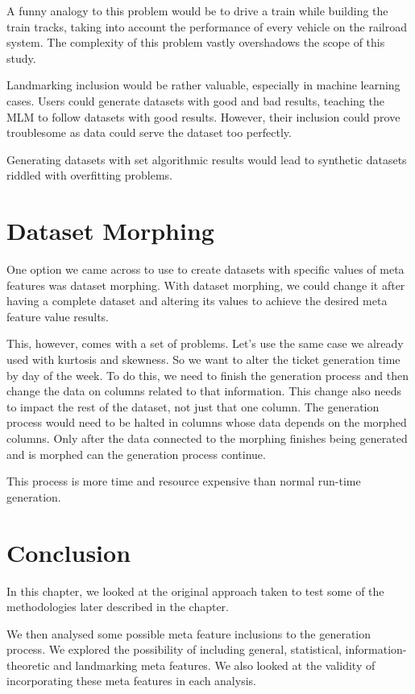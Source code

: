 A funny analogy to this problem would be to drive a train while building the train tracks, taking into account the performance of every vehicle on the railroad system. The complexity of this problem vastly overshadows the scope of this study.

Landmarking inclusion would be rather valuable, especially in machine learning cases. Users could generate datasets with good and bad results, teaching the MLM to follow datasets with good results. However, their inclusion could prove troublesome as data could serve the dataset too perfectly. 

Generating datasets with set algorithmic results would lead to synthetic datasets riddled with overfitting problems.

\section{Dataset Morphing}
One option we came across to use to create datasets with specific values of meta features was dataset morphing. With dataset morphing, we could change it after having a complete dataset and altering its values to achieve the desired meta feature value results.

This, however, comes with a set of problems. Let's use the same case we already used with kurtosis and skewness. So we want to alter the ticket generation time by day of the week. To do this, we need to finish the generation process and then change the data on columns related to that information. This change also needs to impact the rest of the dataset, not just that one column. The generation process would need to be halted in columns whose data depends on the morphed columns. Only after the data connected to the morphing finishes being generated and is morphed can the generation process continue.

This process is more time and resource expensive than normal run-time generation.
\section{Conclusion}
In this chapter, we looked at the original approach taken to test some of the methodologies later described in the chapter. 

We then analysed some possible meta feature inclusions to the generation process. We explored the possibility of including general, statistical, information-theoretic and landmarking meta features. We also looked at the validity of incorporating these meta features in each analysis.

